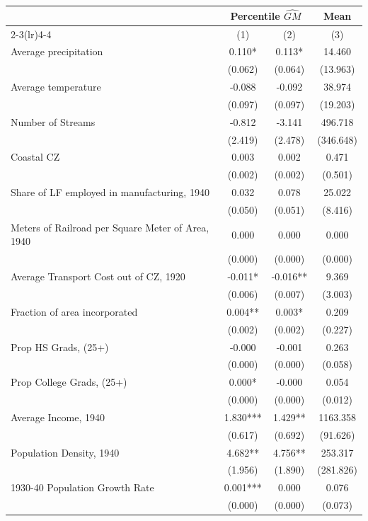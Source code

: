 \begin{tabular}{l*{3}{c}} \toprule
&\multicolumn{2}{c}{Percentile  $\widehat{GM}$}&\multicolumn{1}{c}{Mean}\\\cmidrule(lr){2-3}\cmidrule(lr){4-4}
&\multicolumn{1}{c}{(1)}&\multicolumn{1}{c}{(2)}&\multicolumn{1}{c}{(3)}\\
\midrule 
Average precipitation  &    0.110* & 0.113* & 14.460 \\
                &  (0.062)  &  (0.064)  &  (13.963)    \\
Average temperature  &    -0.088 & -0.092 & 38.974 \\
                &  (0.097)  &  (0.097)  &  (19.203)    \\
Number of Streams  &    -0.812 & -3.141 & 496.718 \\
                &  (2.419)  &  (2.478)  &  (346.648)    \\
Coastal CZ  &    0.003 & 0.002 & 0.471 \\
                &  (0.002)  &  (0.002)  &  (0.501)    \\
Share of LF employed in manufacturing, 1940  &    0.032 & 0.078 & 25.022 \\
                &  (0.050)  &  (0.051)  &  (8.416)    \\
Meters of Railroad per Square Meter of Area, 1940  &    0.000 & 0.000 & 0.000 \\
                &  (0.000)  &  (0.000)  &  (0.000)    \\
Average Transport Cost out of CZ, 1920  &    -0.011* & -0.016** & 9.369 \\
                &  (0.006)  &  (0.007)  &  (3.003)    \\
Fraction of area incorporated  &    0.004** & 0.003* & 0.209 \\
                &  (0.002)  &  (0.002)  &  (0.227)    \\
Prop HS Grads, (25+)  &    -0.000 & -0.001 & 0.263 \\
                &  (0.000)  &  (0.000)  &  (0.058)    \\
Prop College Grads, (25+)  &    0.000* & -0.000 & 0.054 \\
                &  (0.000)  &  (0.000)  &  (0.012)    \\
Average Income, 1940  &    1.830*** & 1.429** & 1163.358 \\
                &  (0.617)  &  (0.692)  &  (91.626)    \\
Population Density, 1940  &    4.682** & 4.756** & 253.317 \\
                &  (1.956)  &  (1.890)  &  (281.826)    \\
1930-40 Population Growth Rate  &    0.001*** & 0.000 & 0.076 \\
                &  (0.000)  &  (0.000)  &  (0.073)    \\
\bottomrule \end{tabular}
